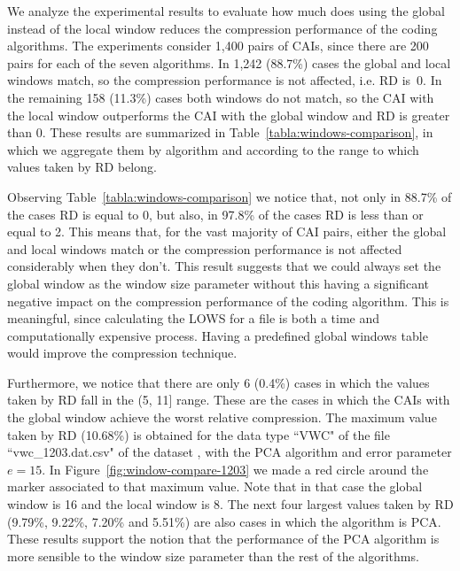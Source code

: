 \clearpage


\clearpage


We analyze the experimental results to evaluate how much does using the global instead of the local window reduces the compression performance of the coding algorithms. The experiments consider 1,400 pairs of CAIs, since there are 200 pairs for each of the seven algorithms. In 1,242 (88.7\%) cases the global and local windows match, so the compression performance is not affected, i.e. RD is~0. In the remaining 158 (11.3\%) cases both windows do not match, so the CAI with the local window outperforms the CAI with the global window and RD is greater than 0. These results are summarized in Table~\ref{tabla:windows-comparison}, in which we aggregate them by algorithm and according to the range to which values taken by RD belong.


\vspace{+5pt}

\vspace{-5pt}


Observing Table~\ref{tabla:windows-comparison} we notice that, not only in 88.7\% of the cases RD is equal to 0, but also, in 97.8\% of the cases RD is less than or equal to 2. This means that, for the vast majority of CAI pairs, either the global and local windows match or the compression performance is not affected considerably when they don't. This result suggests that we could always set the global window as the window size parameter without this having a significant negative impact on the compression performance of the coding algorithm. This is meaningful, since calculating the LOWS for a file is both a time and computationally expensive process. Having a predefined global windows table would improve the compression technique.


Furthermore, we notice that there are only 6 (0.4\%) cases in which the values taken by RD fall in the (5, 11] range. These are the cases in which the CAIs with the global window achieve the worst relative compression. The maximum value taken by RD (10.68\%) is obtained for the data type ``VWC" of the file ``vwc\_1203.dat.csv" of the dataset \datasetsst, with the PCA algorithm and error parameter $e=15$. In Figure~\ref{fig:window-compare-1203} we made a red circle around the marker associated to that maximum value. Note that in that case the global window is 16 and the local window is 8. The next four largest values taken by RD (9.79\%, 9.22\%, 7.20\% and 5.51\%) are also cases in which the algorithm is PCA. These results support the notion that the performance of the PCA algorithm is more sensible to the window size parameter than the rest of the algorithms.


